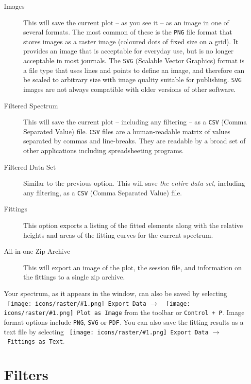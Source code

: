 \documentclass[article,twoside,11pt]{report}
\newcommand{\command}[1]{\texttt{#1}}
\newcommand{\icon}[1]{\texttt{[image: icons/raster/\#1.png]}}
\newcommand{\button}[2]{\ \command{\icon{#1} #2}}
\newcommand{\shortcut}[2]{\command{#1 + #2}}
\newcommand{\menu}[0]{$\rightarrow$}
\newcommand{\tocchapter}[1]{\cleardoublepage\chapter*{#1}\addcontentsline{toc}{chapter}{#1}}
\begin{document}
\begin{description}

\item [Images] This will save the current plot -- as you see it -- as an image in one of several formats. The most common of these is the \command{PNG} file format that stores images as a raster image (coloured dots of fixed size on a grid). It provides an image that is acceptable for everyday use, but is no longer acceptable in most journals. The \command{SVG} (Scalable Vector Graphics) format is a file type that uses lines and points to define an image, and therefore can be scaled to arbitrary size with image quality suitable for publishing. \command{SVG} images are not always compatible with older versions of other software.

\item [Filtered Spectrum] This will save the current plot -- including any filtering -- as a \command{CSV} (Comma Separated Value) file. \command{CSV} files are a human-readable matrix of values separated by commas and line-breaks. They are readable by a broad set of other applications including spreadsheeting programs.

\item [Filtered Data Set] Similar to the previous option. This will save {\em the entire data set}, including any filtering, as a \command{CSV} (Comma Separated Value) file.

\item [Fittings] This option exports a listing of the fitted elements along with the relative heights and areas of the fitting curves for the current spectrum.

\item [All-in-one Zip Archive] This will export an image of the plot, the session file, and information on the fittings to a single zip archive.

\end{description}

Your spectrum, as it appears in the window, can also be saved by selecting 
\button{document-export}{Export Data} \menu\ \button{mime-raster}{Plot as Image} from the toolbar or \shortcut{Control}{P}. Image format options include \command{PNG}, \command{SVG} or \command{PDF}. You can also save the fitting results as a text file by selecting \button{document-export}{Export Data} \menu\ \command{Fittings as Text}.



\tocchapter{Filters}
\end{document}
